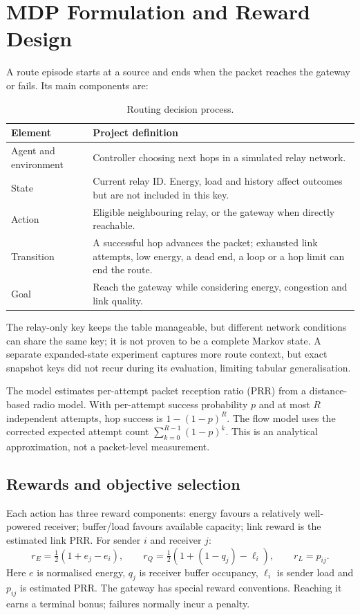 \documentclass[11pt,a4paper]{article}
\begin{document}
\section{MDP Formulation and Reward Design}
A route episode starts at a source and ends when the packet reaches the gateway or fails. Its main components are:
\begin{table}[H]
\centering\small
\caption{Routing decision process.}
\begin{tabularx}{\linewidth}{@{}lY@{}}\toprule
\textbf{Element} & \textbf{Project definition}\\\midrule
Agent and environment & Controller choosing next hops in a simulated relay network.\\
State & Current relay ID. Energy, load and history affect outcomes but are not included in this key.\\
Action & Eligible neighbouring relay, or the gateway when directly reachable.\\
Transition & A successful hop advances the packet; exhausted link attempts, low energy, a dead end, a loop or a hop limit can end the route.\\
Goal & Reach the gateway while considering energy, congestion and link quality.\\\bottomrule
\end{tabularx}
\end{table}
The relay-only key keeps the table manageable, but different network conditions can share the same key; it is not proven to be a complete Markov state. A separate expanded-state experiment captures more route context, but exact snapshot keys did not recur during its evaluation, limiting tabular generalisation.

The model estimates per-attempt packet reception ratio (PRR) from a distance-based radio model. With per-attempt success probability $p$ and at most $R$ independent attempts, hop success is $1-(1-p)^R$. The flow model uses the corrected expected attempt count $\sum_{k=0}^{R-1}(1-p)^k$. This is an analytical approximation, not a packet-level measurement.

\subsection{Rewards and objective selection}
Each action has three reward components: energy favours a relatively well-powered receiver; buffer/load favours available capacity; link reward is the estimated link PRR. For sender $i$ and receiver $j$:
\begin{equation*}
r_E=\tfrac12(1+e_j-e_i),\qquad
r_Q=\tfrac12(1+(1-q_j)-\ell_i),\qquad r_L=p_{ij}.
\end{equation*}
Here $e$ is normalised energy, $q_j$ is receiver buffer occupancy, $\ell_i$ is sender load and $p_{ij}$ is estimated PRR. The gateway has special reward conventions. Reaching it earns a terminal bonus; failures normally incur a penalty.
\end{document}
